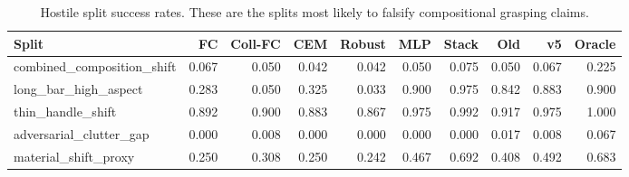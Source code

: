 \begin{table}[t]
\centering
\caption{Hostile split success rates. These are the splits most likely to falsify compositional grasping claims.}
\label{tab:selected-splits}
\scriptsize
\setlength{\tabcolsep}{2.0pt}
\begin{tabular}{lrrrrrrrrr}
\toprule
Split & FC & Coll-FC & CEM & Robust & MLP & Stack & Old & v5 & Oracle \\
\midrule
combined\_composition\_shift & 0.067 & 0.050 & 0.042 & 0.042 & 0.050 & 0.075 & 0.050 & 0.067 & 0.225 \\
long\_bar\_high\_aspect & 0.283 & 0.050 & 0.325 & 0.033 & 0.900 & 0.975 & 0.842 & 0.883 & 0.900 \\
thin\_handle\_shift & 0.892 & 0.900 & 0.883 & 0.867 & 0.975 & 0.992 & 0.917 & 0.975 & 1.000 \\
adversarial\_clutter\_gap & 0.000 & 0.008 & 0.000 & 0.000 & 0.000 & 0.000 & 0.017 & 0.008 & 0.067 \\
material\_shift\_proxy & 0.250 & 0.308 & 0.250 & 0.242 & 0.467 & 0.692 & 0.408 & 0.492 & 0.683 \\
\bottomrule
\end{tabular}
\end{table}
